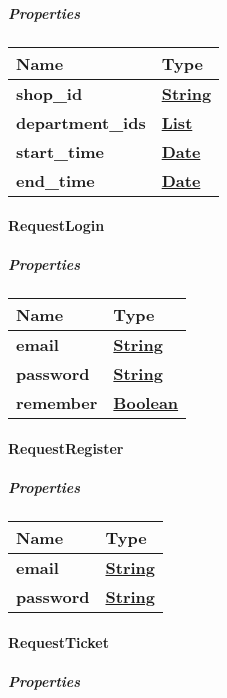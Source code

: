 \hypertarget{properties-3}{%
\subparagraph{Properties}\label{properties-3}}

\begin{longtable}[]{@{}ll@{}}
\toprule
Name & Type\tabularnewline
\midrule
\endhead
\textbf{shop\_id} & \href{string.md}{\textbf{String}}\tabularnewline
\textbf{department\_ids} &
\href{string.md}{\textbf{List}}\tabularnewline
\textbf{start\_time} & \href{DateTime.md}{\textbf{Date}}\tabularnewline
\textbf{end\_time} & \href{DateTime.md}{\textbf{Date}}\tabularnewline
\bottomrule
\end{longtable}

\hypertarget{requestlogin}{%
\paragraph{RequestLogin}\label{requestlogin}}

\hypertarget{properties-4}{%
\subparagraph{Properties}\label{properties-4}}

\begin{longtable}[]{@{}ll@{}}
\toprule
Name & Type\tabularnewline
\midrule
\endhead
\textbf{email} & \href{string.md}{\textbf{String}}\tabularnewline
\textbf{password} & \href{string.md}{\textbf{String}}\tabularnewline
\textbf{remember} & \href{boolean.md}{\textbf{Boolean}}\tabularnewline
\bottomrule
\end{longtable}

\hypertarget{requestregister}{%
\paragraph{RequestRegister}\label{requestregister}}

\hypertarget{properties-5}{%
\subparagraph{Properties}\label{properties-5}}

\begin{longtable}[]{@{}ll@{}}
\toprule
Name & Type\tabularnewline
\midrule
\endhead
\textbf{email} & \href{string.md}{\textbf{String}}\tabularnewline
\textbf{password} & \href{string.md}{\textbf{String}}\tabularnewline
\bottomrule
\end{longtable}

\hypertarget{requestticket}{%
\paragraph{RequestTicket}\label{requestticket}}

\hypertarget{properties-6}{%
\subparagraph{Properties}\label{properties-6}}

